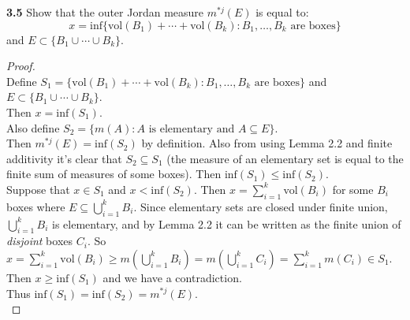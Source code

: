 \documentclass[12pt]{article}
\begin{document}
\hspace{-4 ex}\textbf{3.5} Show that the outer Jordan measure $m^{*j}(E)$ is equal to: $$x = \text{inf}\{\text{vol}(B_1)+\cdots+\text{vol}(B_k) : B_1,\ldots,B_k  \text{ are boxes} \}$$ and $E\subset \{B_1\cup\cdots\cup B_k\}$. \bigbreak

	\begin{proof}  \text{ }\\
		Define $S_1 =  \{\text{vol}(B_1)+\cdots+\text{vol}(B_k) : B_1,\ldots,B_k  \text{ are boxes} \}$ and $E\subset \{B_1\cup\cdots\cup B_k\}$. \\
		Then $x = \text{inf}(S_1)$. \\
		Also define $S_2 = \{m(A) : A \text{ is elementary and } A \subseteq E \}$. \\
		Then $m^{*j}(E) = \text{inf}(S_2)$ by definition. Also from using Lemma 2.2 and finite additivity it's clear that $S_2 \subseteq S_1$ (the measure of an elementary set is equal to the finite sum of measures of some boxes). Then $\text{inf}(S_1) \leq \text{inf}(S_2)$.\\
		
		Suppose that $x \in S_1$ and $ x < \text{inf}(S_2)$. Then $x = \sum\limits_{i=1}^k \text{vol}(B_i)$ for some $B_i$ boxes where $E \subseteq \bigcup\limits_{i=1}^{k}B_i$. Since elementary sets are closed under finite union,  $\bigcup\limits_{i=1}^{k}B_i$ is elementary, and by Lemma 2.2 it can be written as the finite union of \textit{disjoint} boxes $C_i$. So $x = \sum\limits_{i=1}^k \text{vol}(B_i) \geq m(\bigcup\limits_{i=1}^{k}B_i) = m(\bigcup\limits_{i=1}^{k}C_i) = \sum\limits_{i=1}^{k}m(C_i) \in S_1$. Then $x \geq \text{inf}(S_1)$ and we have a contradiction. \\
		Thus $\text{inf}(S_1) = \text{inf}(S_2) = m^{*j}(E)$. \\


\end{proof}
\end{document}
